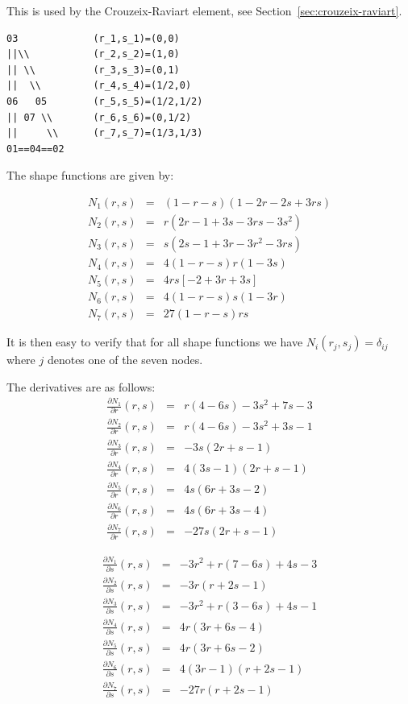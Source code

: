 This is used by the Crouzeix-Raviart element, see Section~\ref{sec:crouzeix-raviart}. 

\begin{verbatim}
03             (r_1,s_1)=(0,0)
||\\           (r_2,s_2)=(1,0)
|| \\          (r_3,s_3)=(0,1)
||  \\         (r_4,s_4)=(1/2,0)
06   05        (r_5,s_5)=(1/2,1/2)
|| 07 \\       (r_6,s_6)=(0,1/2)
||     \\      (r_7,s_7)=(1/3,1/3)
01==04==02    
\end{verbatim}

The shape functions are given by:

\begin{mdframed}[backgroundcolor=blue!5]
\begin{eqnarray}
N_1(r,s) &=&  (1-r-s)(1-2r-2s+ 3rs) \\
N_2(r,s) &=& r (2 r -1 + 3s-3rs-3s^2 ) \\
N_3(r,s) &=& s (2s -1 + 3r-3r^2-3rs )\\
N_4(r,s) &=& 4(1-r-s)r(1 -3s ) \\
N_5(r,s) &=& 4rs [-2+3r+3s]\\
N_6(r,s) &=& 4(1-r-s)s(1-3r)\\
N_7(r,s) &=& 27 (1-r-s)rs 
\end{eqnarray}
\end{mdframed}
It is then easy to verify that for all shape functions we have 
$N_i(r_j,s_j)=\delta_{ij}$ where $j$ denotes one of the seven nodes. 

The derivatives are as follows:
\begin{eqnarray}
\frac{\partial N_1}{\partial r}(r,s) &=& r(4-6s)-3s^2+7s-3\\
\frac{\partial N_2}{\partial r}(r,s) &=& r(4-6s)-3s^2+3s-1\\
\frac{\partial N_3}{\partial r}(r,s) &=& -3s(2r+s-1)  \\
\frac{\partial N_4}{\partial r}(r,s) &=& 4(3s-1)(2r+s-1) \\
\frac{\partial N_5}{\partial r}(r,s) &=& 4s(6r+3s-2) \\
\frac{\partial N_6}{\partial r}(r,s) &=& 4s(6r+3s-4)\\
\frac{\partial N_7}{\partial r}(r,s) &=& -27s(2r+s-1)
\end{eqnarray}

\begin{eqnarray}
\frac{\partial N_1}{\partial s}(r,s) &=& -3r^2+r(7-6s)+4s-3\\
\frac{\partial N_2}{\partial s}(r,s) &=& -3r(r+2s-1)\\
\frac{\partial N_3}{\partial s}(r,s) &=& -3r^2+r(3-6s)+4s-1 \\
\frac{\partial N_4}{\partial s}(r,s) &=& 4r(3r+6s-4)  \\
\frac{\partial N_5}{\partial s}(r,s) &=& 4r(3r+6s-2) \\
\frac{\partial N_6}{\partial s}(r,s) &=& 4(3r-1)(r+2s-1)\\
\frac{\partial N_7}{\partial s}(r,s) &=& -27r(r+2s-1)
\end{eqnarray}


